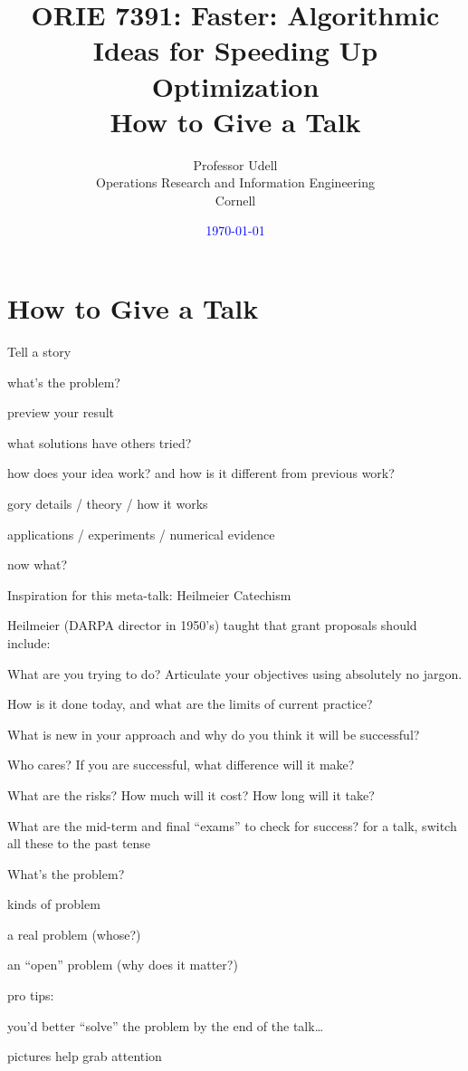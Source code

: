 \documentclass[presentation,xcolor={usenames,dvipsnames}]{beamer}
\title{ORIE 7391: Faster: Algorithmic Ideas for Speeding Up Optimization\\[2ex]
       How to Give a Talk}
\date{\textcolor{blue}{\today}}
\author{Professor Udell \\[1ex]
Operations Research and Information Engineering \\
Cornell}
\begin{document}
\begin{frame}
\titlepage
\end{frame}

\section{How to Give a Talk}

\begin{frame}{Tell a story}

\bit
\item what's the problem?
\item preview your result
\item what solutions have others tried?
\item how does your idea work? and how is it different from previous work?
\item gory details / theory / how it works
\item applications / experiments / numerical evidence
\item now what?
\eit

\end{frame}

\begin{frame}{Inspiration for this meta-talk: Heilmeier Catechism}

Heilmeier (DARPA director in 1950's) taught that grant proposals should include:
\bit
\item What are you trying to do? Articulate your objectives using absolutely no jargon.
\item How is it done today, and what are the limits of current practice?
\item What is new in your approach and why do you think it will be successful?
\item Who cares? If you are successful, what difference will it make?
\item What are the risks? How much will it cost? How long will it take?
\item What are the mid-term and final ``exams'' to check for success?
\eit
for a talk, switch all these to the past tense

\end{frame}

\begin{frame}{What's the problem?}

kinds of problem
\bit
\item a real problem (whose?)
\item an ``open'' problem (why does it matter?)
\eit

pro tips:
\bit
\item you'd better ``solve'' the problem by the end of the talk\ldots
\item pictures help grab attention
\eit

\end{frame}
\end{document}
